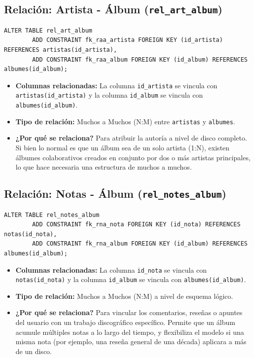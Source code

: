 \documentclass[11pt]{article}
\begin{document}
	\vspace{0.5cm}
	
	\subsection{Relación: Artista - Álbum (\texttt{rel\_art\_album})}
	\begin{lstlisting}[style=sqlstyle]
		ALTER TABLE rel_art_album
		ADD CONSTRAINT fk_raa_artista FOREIGN KEY (id_artista) REFERENCES artistas(id_artista),
		ADD CONSTRAINT fk_raa_album FOREIGN KEY (id_album) REFERENCES albumes(id_album);
	\end{lstlisting}
	\begin{itemize}[noitemsep,topsep=2pt]
		\item \textbf{Columnas relacionadas:} La columna \texttt{id\_artista} se vincula con \texttt{artistas(id\_artista)} y la columna \texttt{id\_album} se vincula con \texttt{albumes(id\_album)}.
		\item \textbf{Tipo de relación:} Muchos a Muchos (N:M) entre \texttt{artistas} y \texttt{albumes}.
		\item \textbf{¿Por qué se relaciona?} Para atribuir la autoría a nivel de disco completo. Si bien lo normal es que un álbum sea de un solo artista (1:N), existen álbumes colaborativos creados en conjunto por dos o más artistas principales, lo que hace necesaria una estructura de muchos a muchos.
	\end{itemize}
	
	\vspace{0.5cm}
	
	\subsection{Relación: Notas - Álbum (\texttt{rel\_notes\_album})}
	\begin{lstlisting}[style=sqlstyle]
		ALTER TABLE rel_notes_album
		ADD CONSTRAINT fk_rna_nota FOREIGN KEY (id_nota) REFERENCES notas(id_nota),
		ADD CONSTRAINT fk_rna_album FOREIGN KEY (id_album) REFERENCES albumes(id_album);
	\end{lstlisting}
	\begin{itemize}[noitemsep,topsep=2pt]
		\item \textbf{Columnas relacionadas:} La columna \texttt{id\_nota} se vincula con \texttt{notas(id\_nota)} y la columna \texttt{id\_album} se vincula con \texttt{albumes(id\_album)}.
		\item \textbf{Tipo de relación:} Muchos a Muchos (N:M) a nivel de esquema lógico.
		\item \textbf{¿Por qué se relaciona?} Para vincular los comentarios, reseñas o apuntes del usuario con un trabajo discográfico específico. Permite que un álbum acumule múltiples notas a lo largo del tiempo, y flexibiliza el modelo si una misma nota (por ejemplo, una reseña general de una década) aplicara a más de un disco.
	\end{itemize}
	
\end{document}
